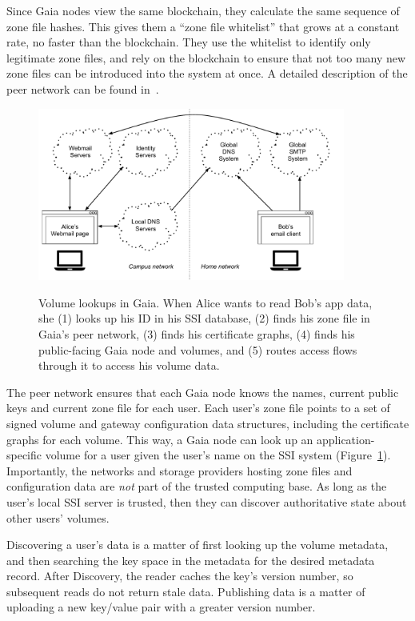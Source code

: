 Since Gaia nodes view the same blockchain, they calculate the same sequence of zone
file hashes.  This gives them a ``zone file whitelist'' that grows at a constant
rate, no faster than the blockchain.  They use the whitelist to identify only
legitimate zone files, and rely on the blockchain to ensure that not too many
new zone files can be introduced into the system at once.  A detailed
description of the peer network can be found in~\cite{ali2017}.

\begin{figure}[h]
   \caption{Volume lookups in Gaia.  When Alice wants to read Bob's app data, she
   (1) looks up his ID in his SSI database, (2) finds his zone file in
   Gaia's peer network, (3) finds his certificate graphs, (4) finds his
   public-facing Gaia node and volumes, and (5) routes access flows through it
   to access his volume data.}
   \centering
   \includegraphics[width=0.9\textwidth,page=18]{figures/dissertation-figures}
   \label{fig:chap3-gaia-volume-lookups}
\end{figure}

The peer network ensures that each Gaia node knows the names, current public
keys and current zone file for each user.  Each user's
zone file points to a set of signed volume and gateway configuration data
structures, including the certificate graphs for each volume. 
This way, a Gaia node can
look up an application-specific volume for a user given the user's name on the
SSI system (Figure~\ref{fig:chap3-gaia-volume-lookups}).  Importantly, the networks and storage
providers hosting zone files and configuration data are \emph{not} part
of the trusted computing base.  As long as the user's local SSI server is
trusted, then they can discover authoritative state about other users' volumes.

Discovering a user's data is a matter of first looking up the volume metadata, and then
searching the key space in the metadata for the desired metadata record.  After
Discovery, the reader caches the key's version number, so subsequent reads do
not return stale data.  Publishing data is a matter of uploading a new key/value
pair with a greater version number.


